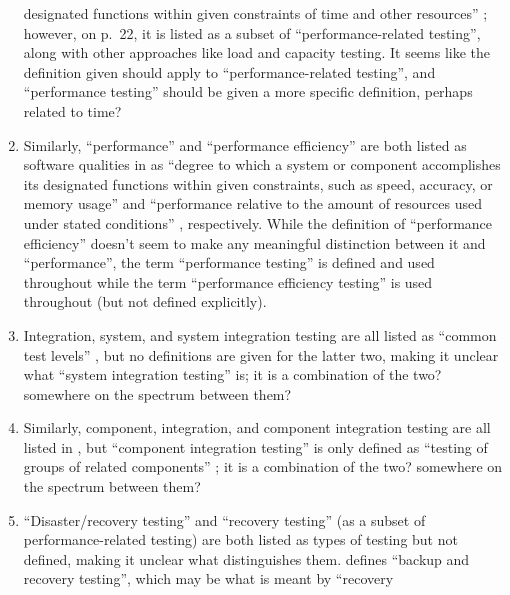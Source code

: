 \begin{enumerate}
            designated functions within given constraints of time and other
            resources'' \cite[p.~7]{IEEE2022}; however, on p.~22, it is listed
            as a subset of ``performance-related testing'', along with other
            approaches like load and capacity testing. It seems
            like the definition given should apply to ``performance-related
            testing'', and ``performance testing'' should be given a more
            specific definition, perhaps related to time?
      \item Similarly, ``performance'' and ``performance efficiency'' are
            both listed as software qualities in as ``degree to which a system
            or component accomplishes its designated functions within given
            constraints, such as speed, accuracy, or memory usage''
            \citep[p.~318]{IEEE2017} and ``performance relative to the amount
            of resources used under stated conditions'' \citep[p.~319]{IEEE2017},
            respectively. While the definition of ``performance efficiency''
            doesn't seem to make any meaningful distinction between it and
            ``performance'', the term ``performance testing'' is defined
            \citep[p.~320]{IEEE2017} and used throughout \citet{IEEE2017} while
            the term ``performance efficiency testing'' is used throughout
            \citet{IEEE2017} (but not defined explicitly).
      \item Integration, system, and system integration testing are all listed
            as ``common test levels'' \cite[p.~12]{IEEE2022}, but no
            definitions are given for the latter two, making it unclear what
            ``system integration testing'' is; it is a combination of the two?
            somewhere on the spectrum between them?
      \item Similarly, component, integration, and component integration
            testing are all listed in \citet{IEEE2017}, but ``component
            integration testing'' is only defined as ``testing of groups of
            related components'' \cite[p.~82]{IEEE2017}; it is a combination of
            the two? somewhere on the spectrum between them?
      \item ``Disaster/recovery testing'' and ``recovery testing'' (as a subset
            of performance-related testing) are both listed as types of testing
            \cite[p.~22]{IEEE2022} but not defined, making it unclear what
            distinguishes them. \citet[p.~2]{IEEE2013} defines ``backup and
            recovery testing'', which may be what is meant by ``recovery

\end{enumerate}
